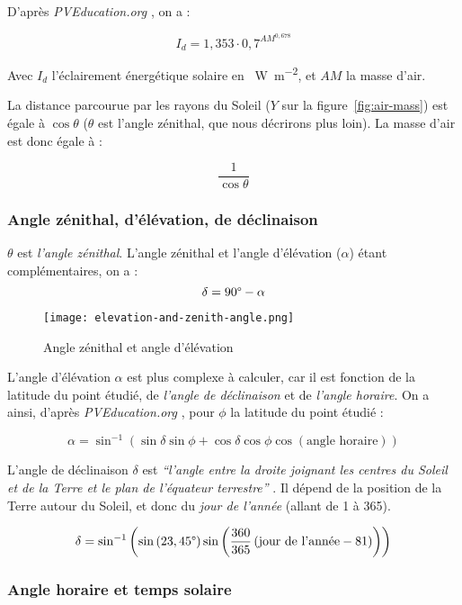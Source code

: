 \documentclass[12pt]{article}
\begin{document}
D'après \emph{PVEducation.org} \cite{pos_air_mass}, on a :

\[
	I_d = 1,353 \cdot 0,7^{{AM}^{0,678}}
\]

Avec $I_d$ l'éclairement énergétique solaire en \SI{}{\watt\per\square\meter}, et $AM$ la masse d'air.

La distance parcourue par les rayons du Soleil ($Y$ sur la figure~\ref{fig:air-mass}) est égale à $\cos \theta$ ($\theta$ est l'angle zénithal, que nous décrirons plus loin).
La masse d'air est donc égale à :

\[\frac{1 }{\cos \theta}\]

\subsubsection{Angle zénithal, d'élévation, de déclinaison}
$\theta$ est \emph{l'angle zénithal}. L'angle zénithal et l'angle d'élévation ($\alpha$) étant complémentaires, on a :
\[
	\delta = 90\degree - \alpha
\]

\begin{figure}[!ht]
	\centerline{\texttt{[image: elevation-and-zenith-angle.png]}}
	\caption{Angle zénithal et angle d'élévation}
	\label{fig:elevation-and-zenith-angle}
\end{figure}

L'angle d'élévation $\alpha$ est plus complexe à calculer, car il est fonction de la latitude du point étudié, de \emph{l'angle de déclinaison} et de \emph{l'angle horaire}. On a ainsi, d'après \emph{PVEducation.org} \cite{pos_elevation_angle}, pour $\phi$ la latitude du point étudié :

\[
	\alpha = \sin^{-1} \left(
		\sin \delta \sin \phi +
		\cos \delta \cos \phi \cos \left( \text{angle horaire} \right)
	\right)
\]

L'angle de déclinaison $\delta$ est \emph{``l'angle entre la droite joignant les centres du Soleil et de la Terre et le plan de l'équateur terrestre''} \cite{mouvement_terre}. Il dépend de la position de la Terre autour du Soleil, et donc du \emph{jour de l'année} (allant de 1 à 365).

\[
	\delta = \sin^{-1} \left(
		\sin \left( 23,45\degree \right)
		\sin \left(
			\frac{360}{365}
			\left(
				\text{jour de l'année} - 81
			\right)
		\right)
	\right)
\]



\subsubsection{Angle horaire et temps solaire} %
\end{document}
